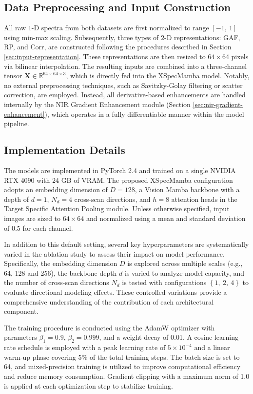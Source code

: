 \documentclass[pdflatex,sn-mathphys-num]{sn-jnl}%
\begin{document}
\subsection{Data Preprocessing and Input Construction}

All raw $1$-D spectra from both datasets are first normalized to range $\left[-1,\ 1\right]$ using min-max scaling. Subsequently, three types of $2$-D representations: GAF, RP, and Corr, are constructed following the procedures described in Section \ref{sec:input-representation}. These representations are then resized to $64\times 64$ pixels via bilinear interpolation. The resulting inputs are combined into a three-channel tensor $\textbf{X} \in \mathbb{R}^{64\times 64\times 3}$, which is directly fed into the XSpecMamba model. Notably, no external preprocessing techniques, such as Savitzky-Golay filtering or scatter correction, are employed. Instead, all derivative-based enhancements are handled internally by the NIR Gradient Enhancement module (Section \ref{sec:nir-gradient-enhancement}), which operates in a fully differentiable manner within the model pipeline.

\subsection{Implementation Details}
The models are implemented in PyTorch 2.4 and trained on a single NVIDIA RTX 4090 with 24 GB of VRAM. The proposed XSpecMamba configuration adopts an embedding dimension of $D = 128$, a Vision Mamba backbone with a depth of $d = 1$, $N_d = 4$ cross-scan directions, and $h = 8$ attention heads in the Target Specific Attention Pooling module. Unless otherwise specified, input images are sized to $64 \times 64$ and normalized using a mean and standard deviation of 0.5 for each channel.

In addition to this default setting, several key hyperparameters are systematically varied in the ablation study to assess their impact on model performance. Specifically, the embedding dimension $D$ is explored across multiple scales (e.g., 64, 128 and 256), the backbone depth $d$ is varied to analyze model capacity, and the number of cross-scan directions $N_d$ is tested with configurations $\left\{1,\ 2,\ 4\right\}$ to evaluate directional modeling effects. These controlled variations provide a comprehensive understanding of the contribution of each architectural component.

The training procedure is conducted using the AdamW optimizer with parameters $\beta_1 = 0.9$, $\beta_2 = 0.999$, and a weight decay of 0.01. A cosine learning-rate schedule is employed with a peak learning rate of $5\times 10^{-4}$ and a linear warm-up phase covering 5\% of the total training steps. The batch size is set to 64, and mixed-precision training is utilized to improve computational efficiency and reduce memory consumption. Gradient clipping with a maximum norm of 1.0 is applied at each optimization step to stabilize training.
\end{document}
